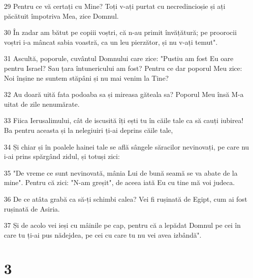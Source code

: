 \par 29 Pentru ce vă certați cu Mine? Toți v-ați purtat cu necredincioșie și ați păcătuit împotriva Mea, zice Domnul.
\par 30 În zadar am bătut pe copiii voștri, că n-au primit învățătură; pe proorocii voștri i-a mâncat sabia voastră, ca un leu pierzător, și nu v-ați temut".
\par 31 Ascultă, poporule, cuvântul Domnului care zice: "Pustiu am fost Eu oare pentru Israel? Sau țara întunericului am fost? Pentru ce dar poporul Meu zice: Noi înșine ne suntem stăpâni și nu mai venim la Tine?
\par 32 Au doară uită fata podoaba sa și mireasa găteala sa? Poporul Meu însă M-a uitat de zile nenumărate.
\par 33 Fiica Ierusalimului, cât de iscusită îți ești tu în căile tale ca să cauți iubirea! Ba pentru aceasta și la nelegiuiri ți-ai deprins căile tale,
\par 34 Și chiar și în poalele hainei tale se află sângele săracilor nevinovați, pe care nu i-ai prins spărgând zidul, și totuși zici:
\par 35 "De vreme ce sunt nevinovată, mânia Lui de bună seamă se va abate de la mine". Pentru că zici: "N-am greșit", de aceea iată Eu cu tine mă voi judeca.
\par 36 De ce atâta grabă ca să-ți schimbi calea? Vei fi rușinată de Egipt, cum ai fost rușinată de Asiria.
\par 37 Și de acolo vei ieși cu mâinile pe cap, pentru că a lepădat Domnul pe cei în care tu ți-ai pus nădejdea, pe cei cu care tu nu vei avea izbândă".

\chapter{3}

